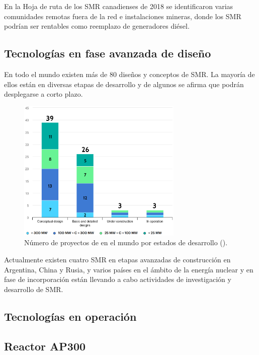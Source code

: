 En la Hoja de ruta de los SMR canadienses de 2018 se identificaron varias comunidades remotas fuera de la red e instalaciones mineras, donde los SMR podrían ser rentables como reemplazo de generadores diésel.


\subsection{Tecnologías en fase avanzada de diseño}

En todo el mundo existen más de 80 diseños y conceptos de SMR. La mayoría de ellos están en diversas etapas de desarrollo y de algunos se afirma que podrán desplegarse a corto plazo.

\begin{figure}[h]
    \centering
    \includegraphics[width=0.7\textwidth]{content/figures/global_smr_projects.png}
    \caption{Número de proyectos de  en el mundo por estados de desarrollo (\cite{iea_global_smr_projects}).}
    \label{fig:global_smr_projects}
\end{figure}

Actualmente existen cuatro SMR en etapas avanzadas de construcción en Argentina, China y Rusia, y varios países en el ámbito de la energía nuclear y en fase de incorporación están llevando a cabo actividades de investigación y desarrollo de SMR.

\subsection{Tecnologías en operación}

\subsection{Reactor AP300}